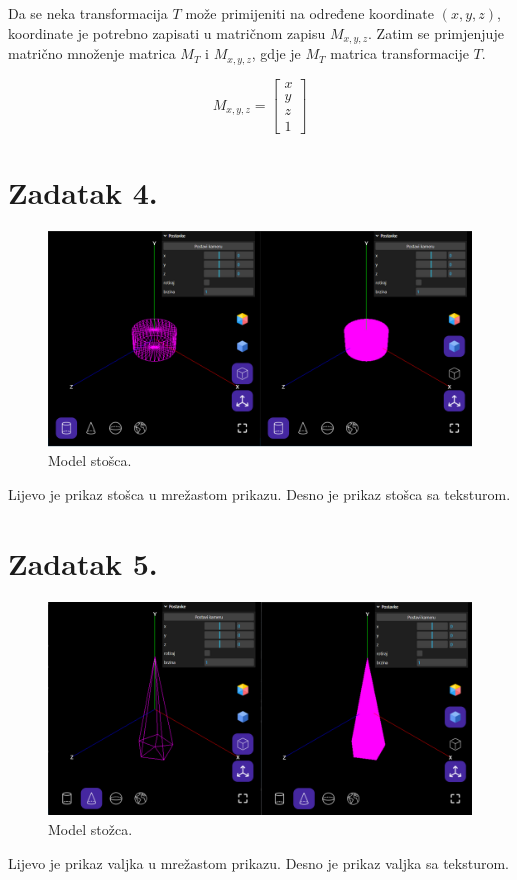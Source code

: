 \documentclass[a4paper,12pt]{article}
\begin{document}
\pagebreak

Da se neka transformacija $T$ može primijeniti na određene koordinate $(x, y, z)$, koordinate je
potrebno zapisati u matričnom zapisu $M_{x,y,z}$. Zatim se primjenjuje matrično množenje
matrica $M_T$ i $M_{x,y,z}$, gdje je $M_T$ matrica transformacije $T$.

\[
M_{x,y,z}=
\begin{bmatrix}
    x \\
    y \\
    z \\
    1
\end{bmatrix}
\]
\pagebreak

\section{Zadatak 4.}

\begin{figure}[ht]
    \centering
    \includegraphics[scale=0.5]{image/zadatak4.png}
    \caption{Model stošca.}
\end{figure}
Lijevo je prikaz stošca u mrežastom prikazu. Desno je prikaz stošca sa teksturom.

\pagebreak

\section{Zadatak 5.}


\begin{figure}[ht]
    \centering
    \includegraphics[scale=0.5]{image/zadatak5.png}
    \caption{Model stožca.}
\end{figure}
Lijevo je prikaz valjka u mrežastom prikazu. Desno je prikaz valjka sa teksturom.
\end{document}

